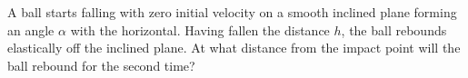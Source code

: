
\item A ball starts falling with zero initial velocity on a smooth inclined plane forming an angle $\alpha$ with the horizontal. Having fallen the distance $h$, the ball rebounds elastically off the inclined plane. At what distance from the impact point will the ball rebound for the second time?
